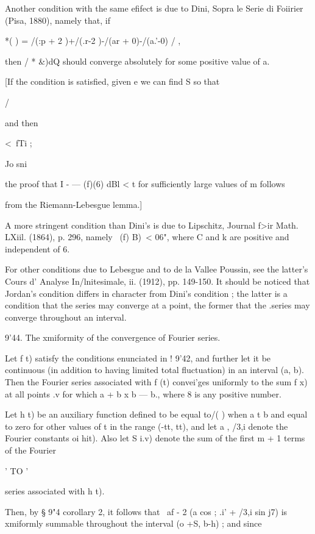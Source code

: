 Another condition with the same efifect is due to Dini, Sopra le Serie di Foiirier 
(Pisa, 1880), namely that, if 

*( ) =  /(:p + 2 )+/(.r-2 )-/(ar + 0)-/(a.'-0) / , 

then / *  \&)dQ should converge absolutely for some positive value of a. 

[If the condition is satisfied, given e we can find S so that 



/ 



and then 



<\ fTi ; 



Jo sni   

the proof that I  -  —   (f)(6) dBl < t for sufficiently large values of m follows 

from the Riemann-Lebesgue lemma.] 

A more stringent condition than Dini's is due to Lipschitz, Journal f>ir Math. LXiil. 
(1864), p. 296, namely \ (f)  B)\ <  06", where C and k are positive and independent of 6. 

For other conditions due to Lebesgue and to de la Vallee Poussin, see the latter's 
Cours d' Analyse In/lnitesimale, ii. (1912), pp. 149-150. It should be noticed that Jordan's 
condition differs in character from Dini's condition ; the latter is a condition that the 
series may converge at a point, the former that the .series may converge throughout an 
interval. 

9'44. The xmiformity of the convergence of Fourier series. 

Let f t) satisfy the conditions enunciated in !  9'42, and further let it be continuous 
(in addition to having limited total fluctuation) in an interval (a, b). Then the Fourier 
series associated with f (t) convei'ges uniformly to the sum f x) at all points .v for which 
a + b x  b — b., where 8 is any positive number. 

Let h  t) be an auxiliary function defined to be equal to/( ) when a t  b and equal 
to zero for other values of t in the range (-tt, tt), and let a , /3,i denote the Fourier 
constants oi hit). Also let S i.v) denote the sum of the first m + 1 terms of the Fourier 

  ' TO   ' 

series associated with h  t). 

Then, by § 9"4 corollary 2, it follows that \ af -  2 (a  cos ; .i' + /3,i sin  j7) is xmiformly 
summable throughout the interval (o +S, b-h) ; and since 

